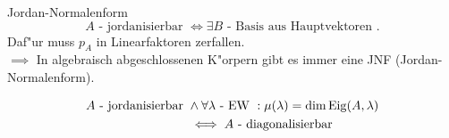 \documentclass[class=article, crop=false]{standalone}
\begin{document}
\begin{zettel}{Jordan-Normalenform}
\[
    A \text{ - jordanisierbar } \iff \exists B \text{ - Basis aus Hauptvektoren }
.\]
Daf"ur muss $p_{A}$ in Linearfaktoren zerfallen.\\
$ \implies $ In algebraisch abgeschlossenen K"orpern gibt es immer eine JNF (Jordan-Normalenform).

\begin{align*}
    A \text{ - jordanisierbar } & \land \forall \lambda \text{ - EW } : \mu (\lambda ) = \dim \operatorname{Eig}(A,\lambda)\\
    & \iff A \text{ - diagonalisierbar } 
\end{align*}

\end{zettel}
\end{document}
